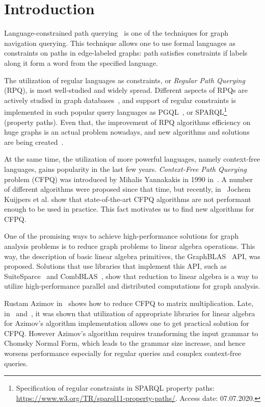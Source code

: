 \section{Introduction}


Language-constrained path querying~\cite{barrett2000formal} is one of the techniques for graph navigation querying.
This technique allows one to use formal languages as constraints on paths in edge-labeled graphs: path satisfies constraints if labels along it form a word from the specified language.

The utilization of regular languages as constraints, or \textit{Regular Path Querying} (RPQ), is most well-studied and widely spread.
Different aspects of RPQs are actively studied in graph databases~\cite{10.1145/2463664.2465216, 10.1145/3104031,10.1145/2850413}, and support of regular constraints is implemented in such popular query languages as PGQL~\cite{10.1145/2960414.2960421}, or SPARQL\footnote{Specification of regular constraints in SPARQL property paths: \url{https://www.w3.org/TR/sparql11-property-paths/}. Access date: 07.07.2020.}~\cite{10.1007/978-3-319-25007-6_1} (property paths).
Even that, the improvement of RPQ algorithms efficiency on huge graphs is an actual problem nowadays, and new algorithms and solutions are being created~\cite{Wang2019,10.1145/2949689.2949711}.

At the same time, the utilization of more powerful languages, namely context-free languages, gains popularity in the last few years. 
\textit{Context-Free Path Querying} problem (CFPQ) was introduced by Mihalis Yannakakis in 1990 in~\cite{Yannakakis}.
A number of different algorithms were proposed since that time, but recently, in~\cite{Kuijpers:2019:ESC:3335783.3335791} Jochem Kuijpers et al. show that state-of-the-art CFPQ algorithms are not performant enough to be used in practice.
This fact motivates us to find new algorithms for CFPQ.

One of the promising ways to achieve high-performance solutions for graph analysis problems is to reduce graph problems to linear algebra operations.
This way, the description of basic linear algebra primitives, the GraphBLAS~\cite{7761646} API, was proposed.
Solutions that use libraries that implement this API, such as SuiteSparce~\cite{10.1145/3322125} and CombBLAS~\cite{10.1177/1094342011403516}, show that reduction to linear algebra is a way to utilize high-performance parallel and distributed computations for graph analysis.

Rustam Azimov in~\cite{Azimov:2018:CPQ:3210259.3210264} shows how to reduce CFPQ to matrix multiplication.
Late, in~\cite{Mishin:2019:ECP:3327964.3328503} and~\cite{10.1145/3398682.3399163}, it was shown that utilization of appropriate libraries for linear algebra for Azimov's algorithm implementation allows one to get practical solution for CFPQ.
However Azimov's algorithm requires transforming the input grammar to Chomsky Normal Form, which leads to the grammar size increase, and hence worsens performance especially for regular queries and complex context-free queries.

